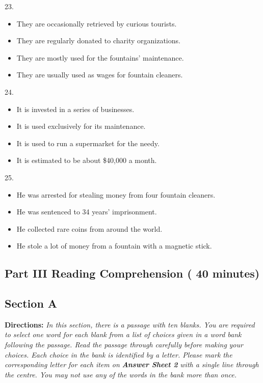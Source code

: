 \documentclass[UTF8,11pt]{ctexart}
\begin{document}
23.


\begin{itemize}[leftmargin=2em,itemsep=.2em,topsep=.4em]\item[A.] They are occasionally retrieved by curious tourists.
\item[B.] They are regularly donated to charity organizations.
\item[C.] They are mostly used for the fountains’ maintenance.
\item[D.] They are usually used as wages for fountain cleaners.
\end{itemize}

24.


\begin{itemize}[leftmargin=2em,itemsep=.2em,topsep=.4em]\item[A.] It is invested in a series of businesses.
\item[B.] It is used exclusively for its maintenance.
\item[C.] It is used to run a supermarket for the needy.
\item[D.] It is estimated to be about \$40,000 a month.
\end{itemize}

25.


\begin{itemize}[leftmargin=2em,itemsep=.2em,topsep=.4em]\item[A.] He was arrested for stealing money from four fountain cleaners.
\item[B.] He was sentenced to 34 years’ imprisonment.
\item[C.] He collected rare coins from around the world.
\item[D.] He stole a lot of money from a fountain with a magnetic stick.
\end{itemize}

\subsection*{\textbf{Part III Reading Comprehension ( 40 minutes)}}


\subsection*{\textbf{Section A}}


\textbf{Directions:} \textit{In this section, there is a passage with ten blanks. You are required to select one word for each blank} \textit{from a list of choices given in a word bank following the passage. Read the passage through carefully before making} \textit{your choices. Each choice in the bank is identified by a letter. Please mark the corresponding letter for each item on} \textbf{\textit{Answer Sheet 2}}\textit{ with a single line through the centre. You may not use any of the words in the bank more than once.}
\end{document}

